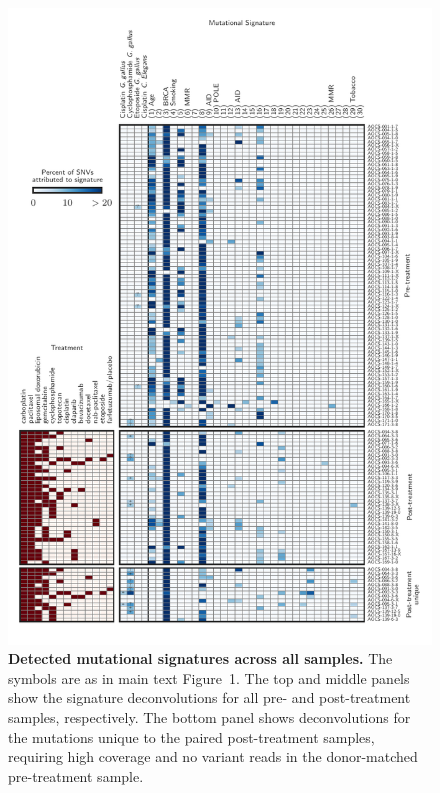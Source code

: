 \documentclass{article}
\begin{document}
\begin{figure}
\centering
\includegraphics[scale=1.0]{../figures/supplementary_signatures.pdf}
\caption{\textbf{Detected mutational signatures across all samples.} The symbols are as in main text Figure~1. The top and middle panels show the signature deconvolutions for all pre- and post-treatment samples, respectively. The bottom panel shows deconvolutions for the mutations unique to the paired post-treatment samples, requiring high coverage and no variant reads in the donor-matched pre-treatment sample.}
\label{fig:supp_signatures}
\end{figure}
\end{document}
